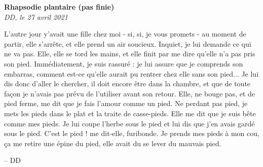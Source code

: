 \documentclass[french,12pt,amstex,a4paper]{article}
\begin{document}
\begin{center}
{\bf Rhapsodie plantaire (pas finie)}\\
{\it DD, le 27 avril 2021}\\
\end{center}

L'autre jour y'avait une fille chez moi - si, si, je vous promets - au moment de partir, elle s'arrête, et elle prend un air soucieux. Inquiet, je lui demande ce qui ne va pas. Elle, elle se tord les mains, et elle finit par me dire qu'elle n'a pas pris son pied. Immédiatement, je suis rassuré : je lui assure que je comprends son embarras, comment est-ce qu'elle aurait pu rentrer chez elle sans son pied... Je lui dis donc d'aller le chercher, il doit encore être dans la chambre, et que de toute façon je n'avais pas prévu de l'utiliser avant son retour. Elle, ne bouge pas, et de pied ferme, me dit que je fais l'amour comme un pied. Ne perdant pas pied, je mets les pieds dans le plat et la traite de casse-pieds. Elle me dit que je suis bête comme mes pieds. Je lui coupe l'herbe sous le pied et lui dis que j'en avais gardé sous le pied. C'est le pied ! me dit-elle, furibonde. Je prends mes pieds à mon cou, ça me retire une épine du pied, elle avait du se lever du mauvais pied.

\begin{flushright}
-- DD
\end{flushright}
\end{document}
